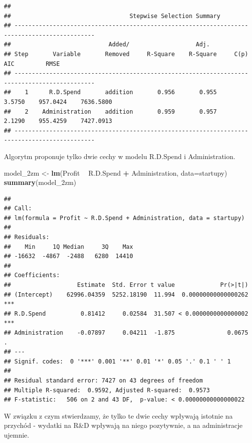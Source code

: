 \documentclass[]{book}
\newenvironment{Shaded}{\begin{snugshade}}{\end{snugshade}}
\newcommand{\DataTypeTok}[1]{\textcolor[rgb]{0.13,0.29,0.53}{#1}}
\newcommand{\KeywordTok}[1]{\textcolor[rgb]{0.13,0.29,0.53}{\textbf{#1}}}
\newcommand{\NormalTok}[1]{#1}
\newcommand{\OperatorTok}[1]{\textcolor[rgb]{0.81,0.36,0.00}{\textbf{#1}}}
\newcommand{\StringTok}[1]{\textcolor[rgb]{0.31,0.60,0.02}{#1}}
\begin{document}
\begin{verbatim}
## 
##                                  Stepwise Selection Summary                                   
## ---------------------------------------------------------------------------------------------
##                            Added/                   Adj.                                         
## Step       Variable       Removed     R-Square    R-Square     C(p)       AIC         RMSE       
## ---------------------------------------------------------------------------------------------
##    1      R.D.Spend       addition       0.956       0.955    3.5750    957.0424    7636.5800    
##    2    Administration    addition       0.959       0.957    2.1290    955.4259    7427.0913    
## ---------------------------------------------------------------------------------------------
\end{verbatim}

Algorytm proponuje tylko dwie cechy w modelu R.D.Spend i Administration.

\begin{Shaded}
\begin{Highlighting}[]
\NormalTok{model_2zm <-}\StringTok{ }\KeywordTok{lm}\NormalTok{(Profit }\OperatorTok{~}\StringTok{ }\NormalTok{R.D.Spend }\OperatorTok{+}\StringTok{ }\NormalTok{Administration, }\DataTypeTok{data=}\NormalTok{startupy)}
\KeywordTok{summary}\NormalTok{(model_2zm)}
\end{Highlighting}
\end{Shaded}

\begin{verbatim}
## 
## Call:
## lm(formula = Profit ~ R.D.Spend + Administration, data = startupy)
## 
## Residuals:
##    Min     1Q Median     3Q    Max 
## -16632  -4867  -2488   6280  14410 
## 
## Coefficients:
##                   Estimate  Std. Error t value             Pr(>|t|)    
## (Intercept)    62996.04359  5252.18190  11.994  0.00000000000000262 ***
## R.D.Spend          0.81412     0.02584  31.507 < 0.0000000000000002 ***
## Administration    -0.07897     0.04211  -1.875               0.0675 .  
## ---
## Signif. codes:  0 '***' 0.001 '**' 0.01 '*' 0.05 '.' 0.1 ' ' 1
## 
## Residual standard error: 7427 on 43 degrees of freedom
## Multiple R-squared:  0.9592, Adjusted R-squared:  0.9573 
## F-statistic:   506 on 2 and 43 DF,  p-value: < 0.00000000000000022
\end{verbatim}

W związku z czym stwierdzamy, że tylko te dwie cechy wpływają istotnie na przychód - wydatki na R\&D wpływają na niego pozytywnie, a na administracje ujemnie.
\end{document}
